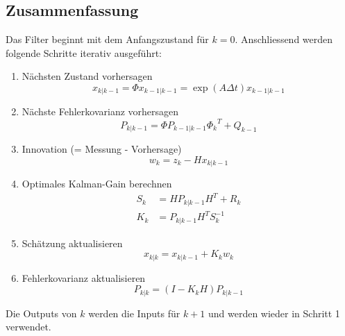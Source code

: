 \subsection{Zusammenfassung }
Das Filter beginnt mit dem Anfangszustand für $k=0$.
Anschliessend werden folgende Schritte iterativ ausgeführt:
\begin{enumerate}
\item Nächsten Zustand vorhersagen
\[
{x_{k|k-1}}=\Phi{x_{k-1|k-1}}= \exp(A\Delta t){x_{k-1|k-1}}
\] 

 \item Nächste Fehlerkovarianz vorhersagen
\[
{P_{k|k-1}}=\Phi {P_{k-1|k-1}} {\Phi _{k}}^T + {Q_{k-1}}
\] 

\item Innovation (= Messung - Vorhersage)
\[
{w_{k}}={z_{k}}-{H}{x_{k|k-1}}
\] 

\item Optimales Kalman-Gain berechnen
\begin{align*}
{S_{k}} &={H}{P_{k|k-1}}{H}^T+{R_{k}}\\
{K_{k}} &= {P_{k|k-1}} {H^T}{S_{k}^{-1}}
\end{align*}

\item Schätzung aktualisieren
\[
{x_{k|k}}={x_{k|k-1}}+{K_{k}}{w_{k}}
\] 

\item Fehlerkovarianz aktualisieren
\[
{P_{k|k}}=(I-{K_{k}}{H}){P_{k|k-1}}
\] 

\end{enumerate}
Die Outputs von $k$ werden die Inputs für ${k+1}$ und werden wieder in Schritt 1 verwendet.

